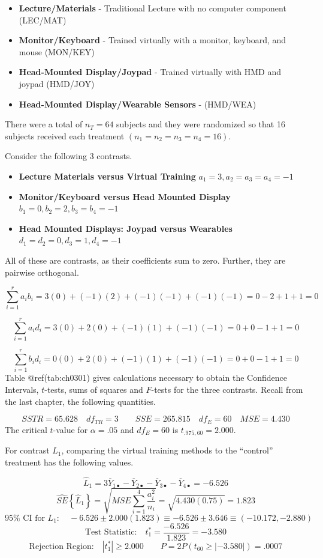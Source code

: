 \documentclass[
]{book}
\providecommand{\tightlist}{%
  \setlength{\itemsep}{0pt}\setlength{\parskip}{0pt}}
\begin{document}
\begin{itemize}
\tightlist
\item
  \textbf{Lecture/Materials} - Traditional Lecture with no computer
  component (LEC/MAT)
\item
  \textbf{Monitor/Keyboard} - Trained virtually with a monitor,
  keyboard, and mouse (MON/KEY)
\item
  \textbf{Head-Mounted Display/Joypad} - Trained virtually with HMD and
  joypad (HMD/JOY)
\item
  \textbf{Head-Mounted Display/Wearable Sensors} - (HMD/WEA)
\end{itemize}

There were a total of \(n_T=64\) subjects and they were randomized so
that 16 subjects received each treatment
\(\left(n_1=n_2=n_3=n_4=16\right)\).

Consider the following 3 contrasts.

\begin{itemize}
\tightlist
\item
  \textbf{Lecture Materials versus Virtual Training}
  \(a_1=3,a_2=a_3=a_4=-1\)
\item
  \textbf{Monitor/Keyboard versus Head Mounted Display}
  \(b_1=0,b_2=2,b_3=b_4=-1\)
\item
  \textbf{Head Mounted Displays: Joypad versus Wearables}
  \(d_1=d_2=0,d_3=1,d_4=-1\)
\end{itemize}

All of these are contrasts, as their coefficients sum to zero. Further,
they are pairwise orthogonal.

\[
\sum_{i=1}^ra_ib_i=3(0)+(-1)(2)+(-1)(-1)+(-1)(-1)=0-2+1+1=0
\]

\[
\sum_{i=1}^ra_id_i=3(0)+2(0)+(-1)(1)+(-1)(-1)=0+0-1+1=0
\]

\[
\sum_{i=1}^rb_id_i=0(0)+2(0)+(-1)(1)+(-1)(-1)=0+0-1+1=0
\] Table @ref(tab:ch0301) gives calculations necessary to obtain the
Confidence Intervals, \(t\)-tests, sums of squares and \(F\)-tests for
the three contrasts. Recall from the last chapter, the following
quantities.

\[
SSTR=65.628 \quad df_{TR}=3 \qquad SSE=265.815 \quad df_E=60 \quad MSE=4.430
\] The critical \(t\)-value for \(\alpha=.05\) and \(df_E=60\) is
\(t_{.975,60}=2.000\).

For contrast \(L_1\), comparing the virtual training methods to the
``control'' treatment has the following values.

\[
\hat{L}_1=3\overline{Y}_{1\bullet}-\overline{Y}_{2\bullet}
-\overline{Y}_{3\bullet}-\overline{Y}_{4\bullet}=-6.526
\] \[
\hat{SE}\left\{\hat{L}_1\right\}=\sqrt{MSE\sum_{i=1}^4\frac{a_i^2}{n_i}}=
\sqrt{4.430(0.75)}=1.823
\] \[
95\% \mbox{ CI for } L_1: \quad -6.526 \pm 2.000(1.823)  \equiv
-6.526 \pm 3.646  \equiv  (-10.172,-2.880)
\] \[
\mbox{Test Statistic:} \quad t_1^* = \frac{-6.526}{1.823}=-3.580
\] \[
\mbox{Rejection Region:}\quad \left|t_1^*\right|\ge 2.000
\qquad
P=2P\left(t_{60}\ge |-3.580|\right)=.0007
\]
\end{document}
